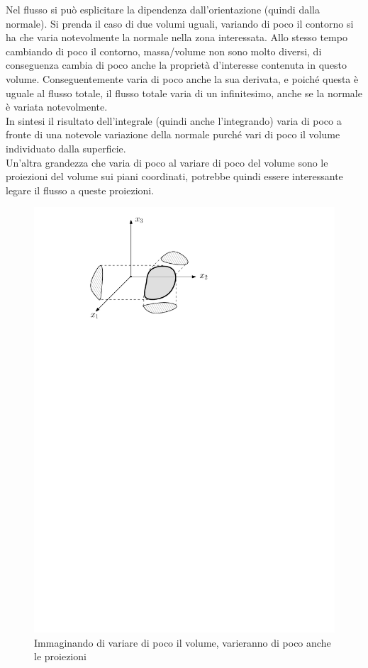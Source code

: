 %
Nel flusso si può esplicitare la dipendenza dall'orientazione (quindi dalla normale).
Si prenda il caso di due volumi uguali, variando di poco il contorno si ha che varia notevolmente la normale nella zona interessata. 
Allo stesso tempo cambiando di poco il contorno, massa/volume non sono molto diversi, di conseguenza cambia di poco anche la proprietà d'interesse contenuta in questo volume. 
Conseguentemente varia di poco anche la sua derivata, e poiché questa è uguale al flusso totale, il flusso totale varia di un infinitesimo, anche se la normale è variata notevolmente. \\
In sintesi il risultato dell'integrale (quindi anche l'integrando) varia di poco a fronte di una notevole variazione della normale purché vari di poco il volume individuato dalla superficie. \\
Un'altra grandezza che varia di poco al variare di poco del volume sono le proiezioni del volume sui piani coordinati, potrebbe quindi essere interessante legare il flusso a queste proiezioni.
%
	\begin{figure}[ht]
		\includegraphics[scale=0.9]{./1.4 Equazioni di bilancio/1.4-3}
		\centering
		\caption{Immaginando di variare di poco il volume, varieranno di poco anche le proiezioni}
	\end{figure}
